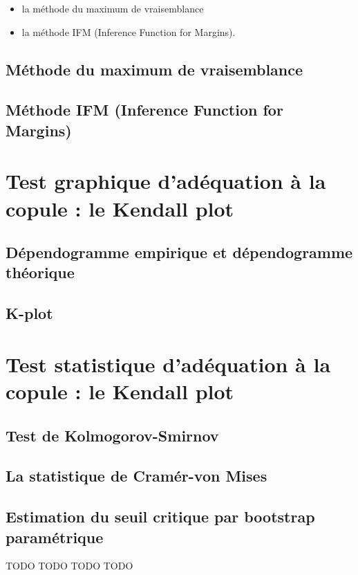 \begin{itemize}
\item la méthode du maximum de vraisemblance
\item la méthode IFM (Inference Function for Margins).
\end{itemize}

\subsection{Méthode du maximum de vraisemblance}

\subsection{Méthode IFM (Inference Function for Margins)}



\section{Test graphique d'adéquation à la copule : le Kendall plot}

\subsection{Dépendogramme empirique et dépendogramme théorique}

\subsection{K-plot}

\section{Test statistique d'adéquation à la copule : le Kendall plot}

\subsection{Test de Kolmogorov-Smirnov}

\subsection{La statistique de Cramér-von Mises}

\subsection{Estimation du seuil critique par bootstrap paramétrique}





TODO   TODO   TODO   TODO



